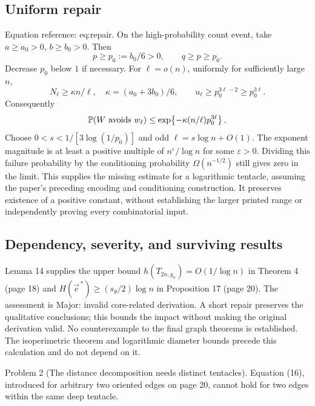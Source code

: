 \documentclass[10pt]{article}
\begin{document}
\subsection*{Uniform repair}
Equation reference: eq:repair. On the high-probability count event, take \(a\geq a_0>0\), \(b\geq b_0>0\). Then \[p\geq p_0:=b_0/6>0,\qquad q\geq p\geq p_0.\] Decrease \(p_0\) below \(1\) if necessary. For \(\ell=o(n)\), uniformly for sufficiently large \(n\), \[N_\ell\geq\kappa n/\ell,\quad \kappa=(a_0+3b_0)/6,\qquad
u_\ell\geq p_0^{3\ell-2}\geq p_0^{3\ell}.\] Consequently \[
\mathbb P(W\hbox{ avoids }w_\ell)
\leq\exp\!\left\{-\kappa(n/\ell)p_0^{3\ell}\right\}.\] Choose \(0<s<1/[3\log(1/p_0)]\) and odd \(\ell=s\log n+O(1)\). The exponent magnitude is at least a positive multiple of \(n^\varepsilon/\log n\) for some \(\varepsilon>0\). Dividing this failure probability by the conditioning probability \(\Omega(n^{-1/2})\) still gives zero in the limit. This supplies the missing estimate for a logarithmic tentacle, assuming the paper’s preceding encoding and conditioning construction. It preserves existence of a positive constant, without establishing the larger printed range or independently proving every combinatorial input.\par
\subsection*{Dependency, severity, and surviving results}
Lemma 14 supplies the upper bound \(h(T_{2n,g_n})=O(1/\log n)\) in Theorem 4 (page 18) and \(H(\vec e^{\,*})\geq(s_\theta/2)\log n\) in Proposition 17 (page 20). The assessment is Major: invalid core-related derivation. A short repair preserves the qualitative conclusions; this bounds the impact without making the original derivation valid. No counterexample to the final graph theorems is established. The isoperimetric theorem and logarithmic diameter bounds precede this calculation and do not depend on it.\par
Problem 2 (The distance decomposition needs distinct tentacles).  Equation (16), introduced for arbitrary two oriented edges on page 20, cannot hold for two edges within the same deep tentacle.\par
\end{document}
